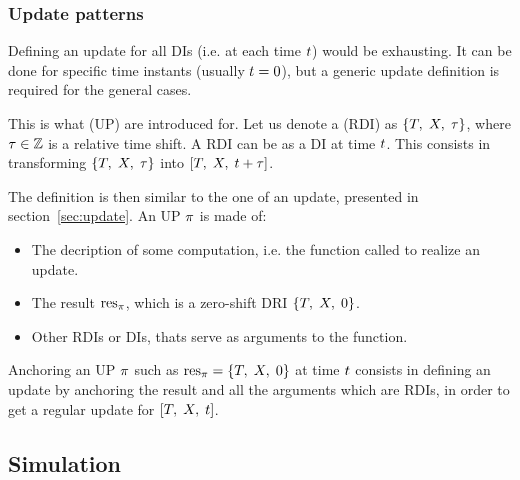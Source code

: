 \subsubsection{Update patterns \label{sec:pattern}}

Defining an update for all DIs (i.e. at each time $t$) would be exhausting. It can be done for specific time instants (usually $t=0$), but a generic update definition is required for the general cases.

This is what  (UP) are introduced for. Let us denote a  (RDI) as $\left\{ T,\;X,\;\tau \right\}$, where ${\tau} \in {\mathbb{Z}}$ is a relative time shift. A RDI can be  as a DI at time $t$. This consists in transforming $\left\{ T,\;X,\;\tau \right\}$ into $\left[ T,\;X,\;{t} + {\tau} \right]$.


The definition is then similar to the one of an update, presented in section~\ref{sec:update}.
An UP $\pi$ is made of:
\begin{itemize}
\item The decription of some computation, i.e. the function called to realize an update.
\item The result ${\mathrm{res}}_{\pi}$, which is a zero-shift DRI $\left\{ T,\;X,\;0 \right\}$.
\item Other RDIs or DIs, thats serve as arguments to the function.
\end{itemize}

Anchoring an UP $\pi$ such as ${{\mathrm{res}}_{\pi}} = {\left\{ T,\;X,\;0 \right\}}$ at time $t$ consists in defining an update by anchoring the result and all the arguments which are RDIs, in order to get a regular update for $\left[ T,\;X,\;t \right]$.


\subsection{Simulation}

